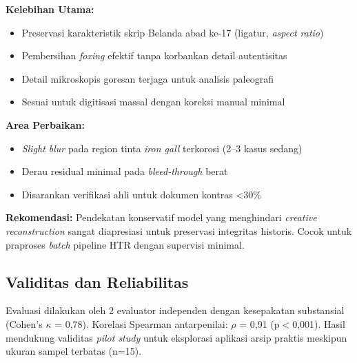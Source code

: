 \documentclass[12pt,a4paper]{article}
\begin{document}
\textbf{Kelebihan Utama:}
\begin{itemize}[leftmargin=*, itemsep=2pt]
    \item Preservasi karakteristik skrip Belanda abad ke-17 (ligatur, \textit{aspect ratio})
    \item Pembersihan \textit{foxing} efektif tanpa korbankan detail autentisitas
    \item Detail mikroskopis goresan terjaga untuk analisis paleografi
    \item Sesuai untuk digitisasi massal dengan koreksi manual minimal
\end{itemize}

\textbf{Area Perbaikan:}
\begin{itemize}[leftmargin=*, itemsep=2pt]
    \item \textit{Slight blur} pada region tinta \textit{iron gall} terkorosi (2--3 kasus sedang)
    \item Derau residual minimal pada \textit{bleed-through} berat
    \item Disarankan verifikasi ahli untuk dokumen kontras <30\%
\end{itemize}

\textbf{Rekomendasi:}
Pendekatan konservatif model yang menghindari \textit{creative reconstruction} sangat diapresiasi untuk preservasi integritas historis. Cocok untuk praproses \textit{batch} pipeline HTR dengan supervisi minimal.

\vspace{2em}

\subsection*{Validitas dan Reliabilitas}

Evaluasi dilakukan oleh 2 evaluator independen dengan kesepakatan substansial (Cohen's $\kappa$ = 0,78). Korelasi Spearman antarpenilai: $\rho$ = 0,91 (p$<$0,001). Hasil mendukung validitas \textit{pilot study} untuk eksplorasi aplikasi arsip praktis meskipun ukuran sampel terbatas (n=15).
\end{document}
